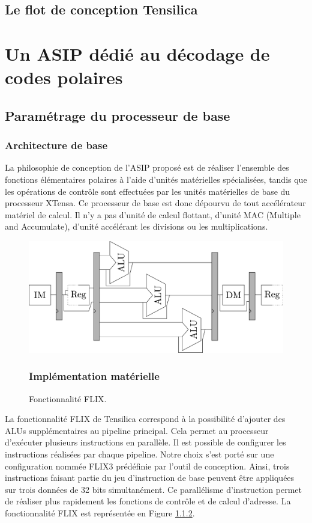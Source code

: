 \subsection{Le flot de conception Tensilica}
\label{tensilica_design}
\section{Un ASIP dédié au décodage de codes polaires}
\label{subsec:sota_sc}
\subsection{Paramétrage du processeur de base}
\subsubsection{Architecture de base}
La philosophie de conception de l'ASIP proposé est de réaliser l'ensemble des fonctions élémentaires polaires à l'aide d'unités matérielles spécialisées, tandis que les opérations de contrôle sont effectuées par les unités matérielles de base du processeur XTensa. Ce processeur de base est donc dépourvu de tout accélérateur matériel de calcul. Il n'y a pas d'unité de calcul flottant, d'unité MAC (Multiple and Accumulate), d'unité accélérant les divisions ou les multiplications.

\begin{figure}
\centering
\includegraphics[width=\textwidth]{main/ch3_fig/flix}
\caption{Fonctionnalité FLIX.}
\subsubsection{Implémentation matérielle}
\label{fig:flix}
\end{figure}

La fonctionnalité FLIX de Tensilica correspond à la possibilité d'ajouter des ALUs supplémentaires au pipeline principal. Cela permet au processeur d'exécuter plusieurs instructions en parallèle. Il est possible de configurer les instructions réalisées par chaque pipeline. Notre choix s'est porté sur une configuration nommée FLIX3 prédéfinie par l'outil de conception. Ainsi, trois instructions faisant partie du jeu d'instruction de base peuvent être appliquées sur trois données de 32 bits simultanément. Ce parallélisme d'instruction permet de réaliser plus rapidement les fonctions de contrôle et de calcul d'adresse. La fonctionnalité FLIX est représentée en Figure \ref{fig:flix}.

